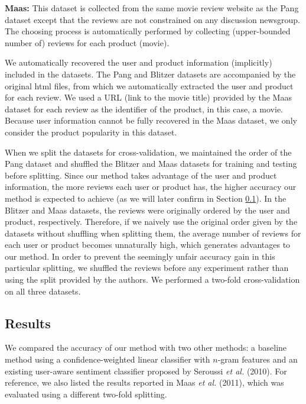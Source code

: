 \documentclass[english]{jnlp_1.4}
\begin{document}
\noindent
\textbf{Maas:}
This dataset is collected from the same movie review website as the Pang dataset except that the reviews are not constrained on any discussion newsgroup.
The choosing  process is automatically performed by collecting (upper-bounded number of) reviews for each product (movie).

We automatically recovered the user and product information (implicitly) included in the datasets.
The Pang and Blitzer datasets are accompanied  by the original html files, from which we automatically extracted the user and product for each review.
We used a URL (link to the movie title) provided by the Maas dataset for each review as the identifier of the product, in this case, a movie.
Because user information cannot be fully recovered in the Maas dataset, we only consider the product popularity in this dataset.

When we split the datasets for cross-validation, we maintained the order of the Pang dataset and shuffled the Blitzer and Maas datasets for training and testing before splitting.
Since our method  takes advantage of the user and product information, the more reviews each user or product has, the higher accuracy our method is expected to achieve (as we will later confirm in Section \ref{sec:exp:acc}).
In the Blitzer and Maas datasets, the reviews were originally ordered by the user and product, respectively.
Therefore, if we naively use the original order given by the datasets without shuffling when splitting them, the average number of reviews for each user or product becomes unnaturally high, which generates advantages to our method.
In order to prevent the seemingly unfair accuracy gain in this particular splitting, we shuffled the reviews before any experiment rather than using the split provided by the authors.  
We performed a two-fold cross-validation on all three datasets.


\subsection{Results}
\label{sec:exp:acc}

We compared the accuracy of our method with two other methods: a baseline method using a confidence-weighted linear classifier with $n$-gram features and an existing user-aware sentiment classifier proposed by Seroussi {\em et al.} (2010). 
For reference, we also listed the results reported in \nocite{maas:2011} Maas {\em et al.} (2011), which was evaluated using a different two-fold splitting.
\end{document}

